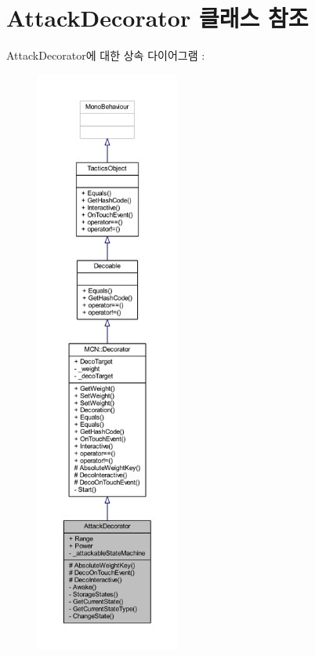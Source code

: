 \hypertarget{class_attack_decorator}{}\section{Attack\+Decorator 클래스 참조}
\label{class_attack_decorator}


Attack\+Decorator에 대한 상속 다이어그램 \+: 
\nopagebreak
\begin{figure}[H]
\begin{center}
\leavevmode
\includegraphics[height=550pt]{class_attack_decorator__inherit__graph}
\end{center}
\end{figure}



